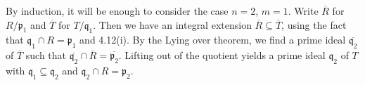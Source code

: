 By induction, it will be enough to consider the case $n = 2$, $m = 1$.
Write $\overline{R}$ for $R/\mathfrak{p}_1$ and $\overline{T}$ for $T/\mathfrak{q_1}$.
Then we have an integral extension $\overline{R} \subseteq \overline{T}$, using
the fact that $\mathfrak{q}_1\cap R = \mathfrak{p}_1$ and 4.12(i). By the
Lying over theorem, we find a prime ideal $\overline{\mathfrak{q}_2}$ of
$\overline{T}$ such that $\overline{\mathfrak{q}_2} \cap \overline{R} = \overline{\mathfrak{p}_2}$.
Lifting out of the quotient yields a prime ideal $\mathfrak{q}_2$ of $T$ with
$\mathfrak{q}_1 \subseteq \mathfrak{q}_2$ and $\mathfrak{q}_2 \cap R = \mathfrak{p}_2$.
